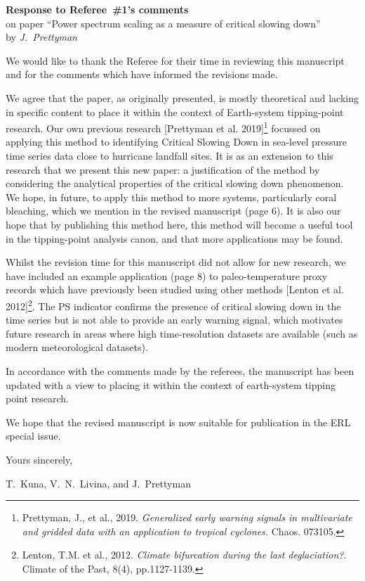 \documentclass[12pt, a4paper]{article}
\begin{document}
\begin{center}
{\bf Response to Referee~\#1's comments}\\
on paper ``Power spectrum scaling as a measure of critical slowing down''\\[5pt]
by {\it J.~Prettyman}
\end{center}

\vspace{3mm}

\noindent We would like to thank the Referee for their time in reviewing this manuscript and for the comments which have informed the revisions made. 

We agree that the paper, as originally presented, is mostly theoretical and lacking in specific content to place it within the context of Earth-system tipping-point research. Our own previous research [Prettyman et al. 2019]\footnote{Prettyman, J., et al., 2019. \emph{Generalized early warning signals in multivariate and gridded data with an application to tropical cyclones.} Chaos. 073105.} focussed on applying this method to identifying Critical Slowing Down in sea-level pressure time series data close to hurricane landfall sites. It is as an extension to this research that we present this new paper: a justification of the method by considering the analytical properties of the critical slowing down phenomenon. We hope, in future, to apply this method to more systems, particularly coral bleaching, which we mention in the revised manuscript (page 6). It is also our hope that by publishing this method here, this method will become a useful tool in the tipping-point analysis canon, and that more applications may be found. 

Whilst the revision time for this manuscript did not allow for new research, we have included an example application (page 8) to paleo-temperature proxy records which have previously been studied using other methods [Lenton et al. 2012]\footnote{Lenton, T.M. et al., 2012. \emph{Climate bifurcation during the last deglaciation?}. Climate of the Past, 8(4), pp.1127-1139.}. The PS indicator confirms the presence of critical slowing down in the time series but is not able to provide an early warning signal, which motivates future research in areas where high time-resolution datasets are available (such as modern meteorological datasets). 

In accordance with the comments made by the referees, the manuscript has been updated with a view to placing it within the context of earth-system tipping point research.

\vspace{7mm}

\noindent
We hope that the revised manuscript is now suitable for publication
in the ERL special issue.

\vspace{5mm}

\noindent
Yours sincerely,

\vspace{1mm}

\noindent
T.~Kuna, V.~N.~Livina, and J.~Prettyman
\end{document}
